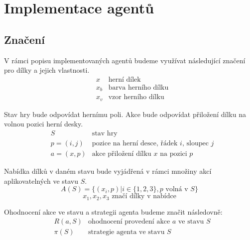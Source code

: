 \chapter{Implementace agentů}

\section{Značení}

V rámci popisu implementovaných agentů budeme využívat následující značení pro dílky a jejich vlastnosti.
\begin{align*}
    &x                                   &\text{herní dílek}\\
    &x_b                                 &\text{barva herního dílku}\\
    &x_v                                 &\text{vzor herního dílku}
\end{align*}

Stav hry bude odpovídat hernímu poli. Akce bude odpovídat přiložení dílku na volnou pozici herní desky.
\begin{align*}
    &S                            &\text{stav hry} \\
    &p = (i,j)                             &\text{pozice na herní desce, řádek $i$, sloupec $j$} \\
    &a = (x,p)                             &\text{akce přiložení dílku $x$ na pozici $p$}
\end{align*}

Nabídka dílků v daném stavu bude vyjádřená v rámci množiny akcí aplikovatelných ve stavu $S$.
\begin{equation*}
    A(S) = \{(x_i,p) | i\in\{1,2,3\}, p \text{ volná v } S \}
\end{equation*}
\begin{equation*}
    x_1, x_2, x_3 \text{ značí dílky v nabídce}
\end{equation*}

Ohodnocení akce ve stavu a strategii agenta budeme značit následovně:
\begin{align*}
    &R(a,S)                                &\text{ohodnocení provedení akce $a$ ve stavu $S$} \\
    &\pi(S)                                &\text{strategie agenta ve stavu $S$}
\end{align*}

